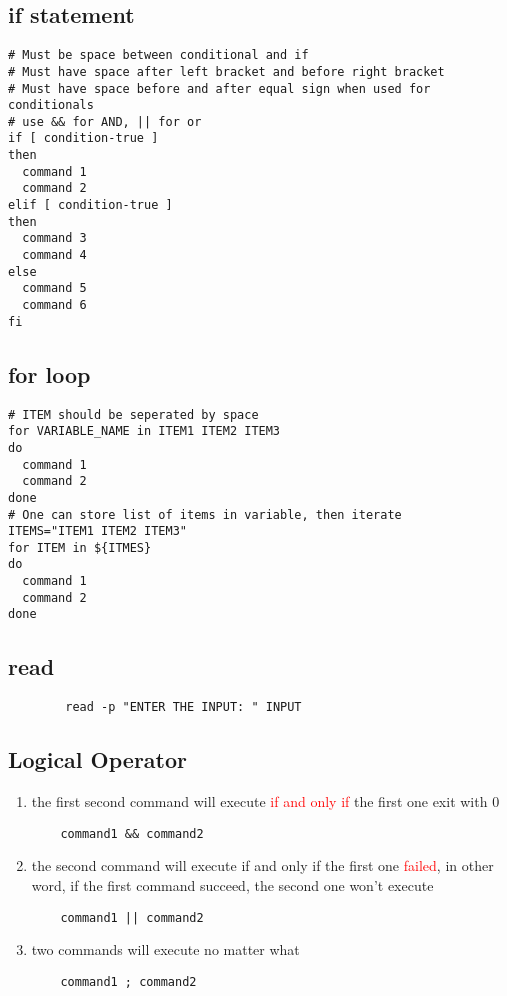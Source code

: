 \documentclass[12pt,a4paper]{article}
\newcommand{\rt}[1]{\textcolor{red}{#1}}
\begin{document}
\subsection{if statement}
\begin{footnotesize}
\begin{verbatim}
# Must be space between conditional and if
# Must have space after left bracket and before right bracket
# Must have space before and after equal sign when used for conditionals
# use && for AND, || for or
if [ condition-true ]
then
  command 1
  command 2
elif [ condition-true ]
then
  command 3
  command 4
else
  command 5
  command 6
fi
\end{verbatim}
\end{footnotesize}
\subsection{for loop}
\begin{footnotesize}
\begin{verbatim}
# ITEM should be seperated by space
for VARIABLE_NAME in ITEM1 ITEM2 ITEM3
do
  command 1
  command 2
done
# One can store list of items in variable, then iterate
ITEMS="ITEM1 ITEM2 ITEM3"
for ITEM in ${ITMES}
do
  command 1
  command 2
done
\end{verbatim}
\end{footnotesize}

\subsection{read}
\begin{footnotesize}
	\begin{verbatim}
		read -p "ENTER THE INPUT: " INPUT
	\end{verbatim}
\end{footnotesize}

\subsection{Logical Operator}
\begin{enumerate}
	\item the first second command will execute \rt{if and only if} the first one exit with 0
	\begin{verbatim}
	command1 && command2
	\end{verbatim}
	\item the second command will execute if and only if the first one \rt{failed}, in other word, if the first command succeed, the second one won't execute
	\begin{verbatim}
	command1 || command2
	\end{verbatim}
	\item two commands will execute no matter what
	\begin{verbatim}
	command1 ; command2
	\end{verbatim}
\end{enumerate}
\end{document}
